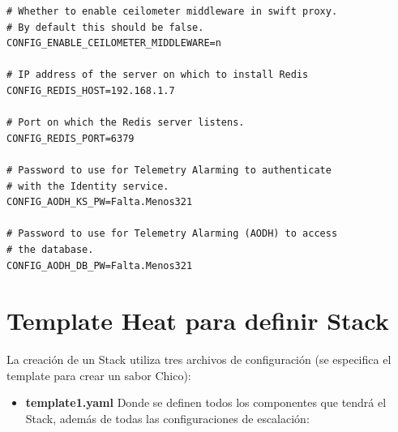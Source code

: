 \documentclass[12pt,a4paper,oneside]{book}
\begin{document}
\begin{lstlisting}[style=codigobase,  caption= answers.cfg]
# Whether to enable ceilometer middleware in swift proxy.
# By default this should be false.
CONFIG_ENABLE_CEILOMETER_MIDDLEWARE=n

# IP address of the server on which to install Redis
CONFIG_REDIS_HOST=192.168.1.7

# Port on which the Redis server listens.
CONFIG_REDIS_PORT=6379

# Password to use for Telemetry Alarming to authenticate 
# with the Identity service.
CONFIG_AODH_KS_PW=Falta.Menos321

# Password to use for Telemetry Alarming (AODH) to access
# the database.
CONFIG_AODH_DB_PW=Falta.Menos321
\end{lstlisting}


\section{Template Heat para definir Stack}
\label{seccB.2}

La creación de un Stack utiliza tres archivos de configuración (se especifica el template para crear un sabor Chico):

\begin{itemize}
    \item \textbf{template1.yaml} Donde se definen todos los componentes que tendrá el Stack, además de todas las configuraciones de escalación:
\end{itemize}   

\vspace{0,5cm}
\end{document}
